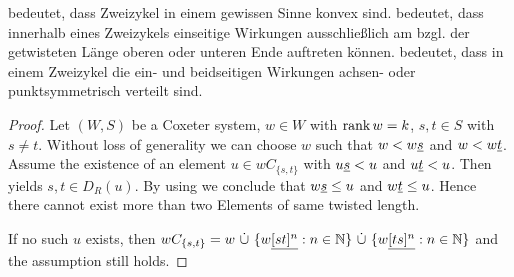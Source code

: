 \begin{rema}
	 bedeutet, dass Zweizykel in einem
	gewissen Sinne konvex sind.
	 bedeutet,
	dass innerhalb eines Zweizykels einseitige Wirkungen ausschließlich am bzgl.
	der ge\-twis\-te\-ten Länge oberen oder unteren Ende auftreten können.
	 bedeutet, dass in einem Zweizykel die
	ein- und beidseitigen Wirkungen achsen- oder punktsymmetrisch verteilt sind.
\end{rema}

\begin{lemm}
\begin{proof}
Let $(W,S)$ be a Coxeter system, $w \in W$ with $\operatorname{rank} w = k$, $s, t \in S$ with
$s \neq t$. Without loss of generality we can choose $w$ such that $w < w \underline{s}$
and $w < w \underline{t}$. Assume the existence of an element $u \in wC_{\{s,t\}}$ with
$u \underline{s} < u$ and $u \underline{t} < u$. Then \cite[Lemma
3.8]{hultman:comb-twisted-invo} yields $s,t \in D_R(u)$. By using \cite[Lemma
3.9]{hultman:comb-twisted-invo} we conclude that $w \underline{s} \leq u$ and $w \underline{t}
\leq u$. Hence there cannot exist more than two Elements of same twisted
length.

If no such $u$ exists, then $wC_{\{s,t\}} = w \ \dot \cup \ \{ w \ul{[st]^n} : n
\in \nn \} \ \dot \cup \ \{ w \ul{[ts]^n} : n \in \nn \}$ and the assumption
still holds.
\end{proof}
\end{lemm}